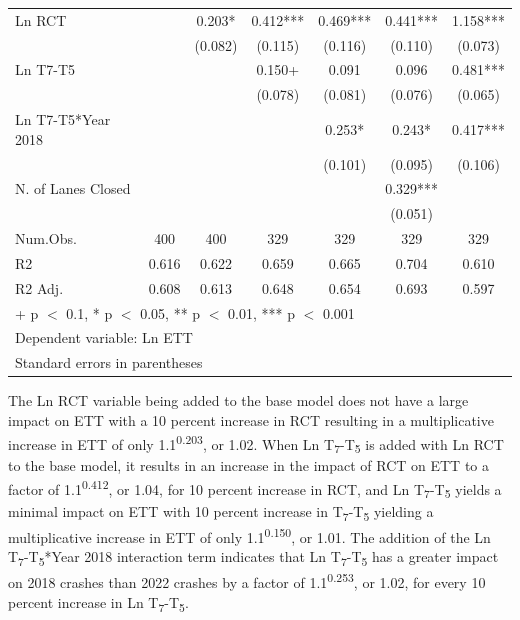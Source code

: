 \documentclass[
  letterpaper,
  authoryear]{elsarticle}
\begin{document}
\begin{table}
{\begin{tabular}[t]{lcccccc}
Ln RCT &  & 0.203* & 0.412*** & 0.469*** & 0.441*** & 1.158***\\
 &  & (0.082) & (0.115) & (0.116) & (0.110) & (0.073)\\
Ln T7-T5 &  &  & 0.150+ & 0.091 & 0.096 & 0.481***\\
 &  &  & (0.078) & (0.081) & (0.076) & (0.065)\\
Ln T7-T5*Year 2018 &  &  &  & 0.253* & 0.243* & 0.417***\\
 &  &  &  & (0.101) & (0.095) & (0.106)\\
N. of Lanes Closed &  &  &  &  & 0.329*** & \\
 &  &  &  &  & (0.051) & \\
\midrule
Num.Obs. & 400 & 400 & 329 & 329 & 329 & 329\\
R2 & 0.616 & 0.622 & 0.659 & 0.665 & 0.704 & 0.610\\
R2 Adj. & 0.608 & 0.613 & 0.648 & 0.654 & 0.693 & 0.597\\
\bottomrule
\multicolumn{7}{l}{\rule{0pt}{1em}+ p $<$ 0.1, * p $<$ 0.05, ** p $<$ 0.01, *** p $<$ 0.001}\\
\multicolumn{7}{l}{\rule{0pt}{1em}Dependent variable: Ln ETT}\\
\multicolumn{7}{l}{\rule{0pt}{1em}Standard errors in parentheses}\\
\end{tabular}

}

\end{table}%

The Ln RCT variable being added to the base model does not have a large
impact on ETT with a 10 percent increase in RCT resulting in a
multiplicative increase in ETT of only 1.1\textsuperscript{0.203}, or
1.02. When Ln T\textsubscript{7}-T\textsubscript{5} is added with Ln RCT
to the base model, it results in an increase in the impact of RCT on ETT
to a factor of 1.1\textsuperscript{0.412}, or 1.04, for 10 percent
increase in RCT, and Ln T\textsubscript{7}-T\textsubscript{5} yields a
minimal impact on ETT with 10 percent increase in
T\textsubscript{7}-T\textsubscript{5} yielding a multiplicative increase
in ETT of only 1.1\textsuperscript{0.150}, or 1.01. The addition of the
Ln T\textsubscript{7}-T\textsubscript{5}*Year 2018 interaction term
indicates that Ln T\textsubscript{7}-T\textsubscript{5} has a greater
impact on 2018 crashes than 2022 crashes by a factor of
1.1\textsuperscript{0.253}, or 1.02, for every 10 percent increase in Ln
T\textsubscript{7}-T\textsubscript{5}.
\end{document}
